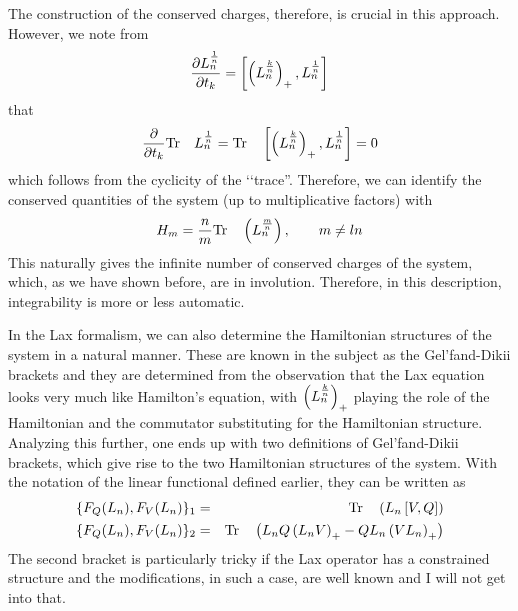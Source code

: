 \documentclass[a4paper,11pt]{article}
\begin{document}
The construction of the conserved charges, therefore, is crucial in
this approach. However, we note from
\begin{equation}
{\partial L_{n}^{1\over n}\over \partial t_{k}} = \left[
\left(L_{n}^{k\over n}\right)_{+} , L_{n}^{1\over n} \right]
\end{equation}
that
\begin{equation}
{\partial\over \partial t_{k}} {\rm Tr}\quad L_{n}^{1\over n} = {\rm
Tr}\quad \left[
\left(L_{n}^{k\over n}\right)_{+} , L_{n}^{1\over n} \right] = 0
\end{equation}
which follows from the cyclicity of the \lq\lq trace''. Therefore, we
can identify the conserved quantities of the system (up to
multiplicative factors) with
\begin{equation}
H_{m} = {n\over m} {\rm Tr}\quad \left(L_{n}^{m\over n}\right),\qquad
m \neq ln
\end{equation}
This naturally gives the infinite number of conserved charges of the
system, which, as we have shown before, are in involution. Therefore,
in this description, integrability is more or less automatic.
\vfill\eject


In the Lax formalism, we can also determine the Hamiltonian structures
of the system in a natural manner. These are known in the subject as
the Gel'fand-Dikii brackets and they are determined from the
observation that the Lax equation looks very much like Hamilton's
equation, with $\left(L_{n}^{k\over n}\right)_{+}$ playing the role of
the Hamiltonian and the commutator substituting for the Hamiltonian
structure. Analyzing this further, one ends up with two definitions of
Gel'fand-Dikii brackets, which give rise to the two Hamiltonian
structures of the system. With the notation of the linear functional
defined earlier, they can be written as
\begin{eqnarray}
\{F_{Q}(L_{n}) , F_{V}(L_{n})\}_{1} & = & {\rm Tr}\quad \left(L_{n}
\left[V , Q \right]\right)\nonumber\\
\{F_{Q}(L_{n}) , F_{V}(L_{n}) \}_{2} & = & {\rm Tr}\quad
\left(L_{n}Q\left(L_{n}V\right)_{+} - QL_{n}
\left(VL_{n}\right)_{+}\right)
\end{eqnarray}
The second bracket is particularly tricky if the Lax operator has a
constrained structure and the modifications, in such a case, are well
known and I will not get into that.
\end{document}
